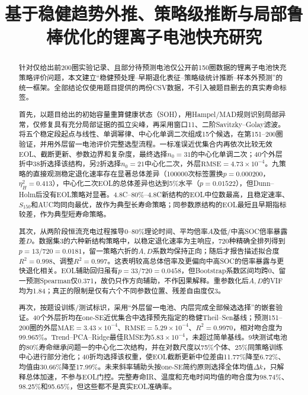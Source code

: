 \documentclass[withoutpreface]{cumcmthesis}
\title{基于稳健趋势外推、策略级推断与局部鲁棒优化的锂离子电池快充研究}
\newcommand{\RMSE}{\mathrm{RMSE}}
\newcommand{\MAE}{\mathrm{MAE}}
\begin{document}
\maketitle

\begin{abstract}
针对仅给出前200圈实验记录、且部分待预测电池仅公开前150圈数据的锂离子电池快充策略评价问题，本文建立“稳健预处理--早期退化表征--策略级统计推断--样本外预测”的统一框架。全部结论仅使用题目提供的两份CSV数据，不引入被题目删去的真实寿命标签。

首先，以题目给出的初始容量重算健康状态（SOH），用Hampel/MAD规则识别局部异常，仅修复具有充分局部证据的孤立尖峰，再采用窗口11、二阶Savitzky--Golay滤波。将五个稳定段起点与线性、单调幂律、中心化单调二次组成15个候选，在第151--200圈验证，并用外层留一电池评价完整选型流程。一标准误近优集合内再依次比较无效EOL、截断更新、参数边界和复杂度，最终选择$n_0=31$的中心化单调二次；40个外层折中38折选择该结构，另2折选择$n_0=21$中心化二次，外层$\RMSE=4.73\times10^{-4}$。九策略的直接观测稳定退化速率存在显著总体差异（100000次标签置换$p=0.000200$，$\eta_H^2=0.413$），中心化二次EOL的总体差异也达到5\%水平（$p=0.01522$），但Dunn--Holm后没有EOL策略对显著。4.8C--80\%--4.8C新结构的EOL中位数最高，且稳定速率、$S_{150}$和AUC均同向最优，故作为典型长寿命策略；同参数原结构的EOL最短且早期指标较差，作为典型短寿命策略。

其次，从两阶段恒流充电过程推导0--80\%理论时间、平均倍率$A$及低/中高SOC倍率暴露差$D$。数据集3的六种新结构策略中，以稳定退化速率为主响应，720种精确全排列得到$p=13/720=0.0181$，留一策略六折的$A,D$系数均保持正向；随后才报告描述拟合度$R^2=0.998$、调整$R^2=0.997$。这表明较高总体倍率及更偏向中高SOC的倍率暴露与更快退化相关。EOL辅助回归虽有$p=33/720=0.0458$，但Bootstrap系数区间均跨0、留一预测Spearman仅0.371，故仍只作方向辅助，不作因果解释。重参数化后$A,D$的VIF均为1.84；真正的限制是仅有六个不同参数位置、残差自由度仅3。

再次，按题设训练/测试标识，采用“外层留一电池、内层完成全部候选选择”的嵌套验证。40个外层折均在one-SE近优集合中选择预先指定的稳健Theil--Sen基线；预测151--200圈的外层$\MAE=3.43\times10^{-4}$、$\RMSE=5.29\times10^{-4}$、$R^2=0.9970$，相对吻合度为99.965\%。Trend--PCA--Ridge最佳RMSE为$5.83\times10^{-4}$，未超过简单基线。9块测试电池的80\%寿命继承问题一的中心化二次结构，并在对数尺度以75\%个体、25\%同策略训练中心进行部分池化；40折均选择该权重，使EOL截断更新中位差由11.77\%降至6.72\%、均值由30.66\%降至17.99\%。未来斜率辅助头按one-SE简约原则选择全体均值$\Delta k$，只解释总体加速，不参与EOL门控。完整寿命IR、温度和充电时间均值的吻合度为98.74\%、98.25\%和95.65\%，但这些都不是真实EOL准确率。


\end{abstract}
\end{document}
